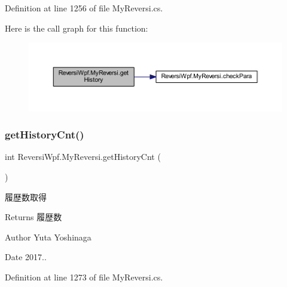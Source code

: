 Definition at line 1256 of file My\+Reversi.\+cs.

Here is the call graph for this function\+:
\nopagebreak
\begin{figure}[H]
\begin{center}
\leavevmode
\includegraphics[width=350pt]{class_reversi_wpf_1_1_my_reversi_aa85fcb151ab7c188b0637b9eb9269baa_cgraph}
\end{center}
\end{figure}
\mbox{\label{class_reversi_wpf_1_1_my_reversi_a9e6ba44101405de13825f3585fda00af}} 
\subsubsection{\texorpdfstring{get\+History\+Cnt()}{getHistoryCnt()}}
{\footnotesize\ttfamily int Reversi\+Wpf.\+My\+Reversi.\+get\+History\+Cnt (\begin{DoxyParamCaption}{ }\end{DoxyParamCaption})}



履歴数取得 

\begin{DoxyReturn}{Returns}
履歴数 
\end{DoxyReturn}
\begin{DoxyAuthor}{Author}
Yuta Yoshinaga 
\end{DoxyAuthor}
\begin{DoxyDate}{Date}
2017.. 
\end{DoxyDate}


Definition at line 1273 of file My\+Reversi.\+cs.

\mbox{\label{class_reversi_wpf_1_1_my_reversi_a34b0c0b96b147a8d2f1dc6863cac25d8}} 
